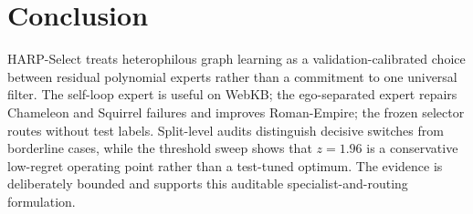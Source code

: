 \documentclass[letterpaper]{article} %
\newcommand{\method}{HARP-Select}
\begin{document}
\section{Conclusion}

\method{} treats heterophilous graph learning as a validation-calibrated choice between residual polynomial experts rather than a commitment to one universal filter.
The self-loop expert is useful on WebKB; the ego-separated expert repairs Chameleon and Squirrel failures and improves Roman-Empire; the frozen selector routes without test labels.
Split-level audits distinguish decisive switches from borderline cases, while the threshold sweep shows that $z=1.96$ is a conservative low-regret operating point rather than a test-tuned optimum.
The evidence is deliberately bounded and supports this auditable specialist-and-routing formulation.

\clearpage
{}
\raggedbottom
\begingroup
\small

\endgroup
\end{document}
